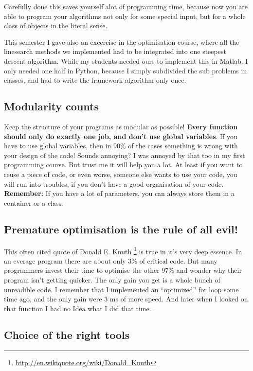 \documentclass[letterpaper,10pt,english]{manual}
\begin{document}
Carefully done this saves yourself alot of programming time, because now you are able
to program your algorithms not only for some special input, but for a whole class of objects
in the literal sense.

This semester I gave also an excercise in the optimisation course, where
all the linesearch methods we implemented had to be integrated into one steepest descent algorithm.
While my students needed ours to implement this in Matlab. I only needed one half in Python, because
I simply subdivided the sub problems in classes, and had to write the framework algorithm only once.


\subsection{Modularity counts}

Keep the structure of your programs as modular as possible!
\textbf{Every function should only do exactly one job, and don't use
global variables}. If you have to use global variables, then in
90\% of the cases something is wrong with your design of the code!
Sounds annoying? I was annoyed by that too in my first programming
course. But trust me it will help you a lot. At least if you want to
reuse a piece of code, or even worse, someone else wants to use your
code, you will run into troubles, if you don't have a good
organisation of your code. \textbf{Remember:}  If you have a lot of
parameters, you can always store them in a container or a class.


\subsection{Premature optimisation is the rule of all evil!}

This often cited quote of Donald E. Knuth \footnote{
\href{http://en.wikiquote.org/wiki/Donald\_Knuth}{http://en.wikiquote.org/wiki/Donald\_Knuth}
} is true in it's very deep essence. In an everage program
there are about only 3\% of critical code. But many programmers invest their time to optimise the
other 97\% and wonder why their program isn't getting quicker. The only gain you get is a whole bunch
of unreadible code. I remember that I implemented an ``optimized'' for loop some time ago, and the only gain were
3 ms of more speed. And later when I looked on that function I had no Idea what I did that time...


\subsection{Choice of the right tools}
\end{document}

